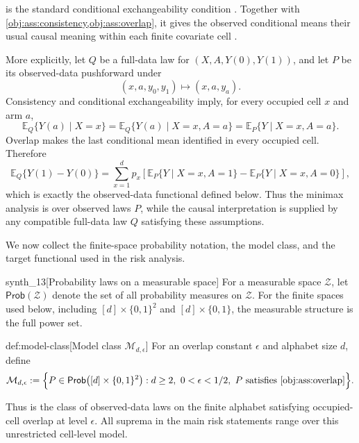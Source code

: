  is the standard conditional exchangeability condition \citep{ZengBalakrishnanHanKennedy2024}. Together with \cref{obj:ass:consistency,obj:ass:overlap}, it gives the observed conditional means their usual causal meaning within each finite covariate cell \citep{RosenbaumRubin1983,ImbensRubin2015}.

More explicitly, let \(Q\) be a full-data law for
\((X,A,Y(0),Y(1))\), and let \(P\) be its observed-data pushforward under
\[
(x,a,y_0,y_1)\longmapsto (x,a,y_a).
\]
Consistency and conditional exchangeability imply, for every occupied cell \(x\) and arm \(a\),
\[
\mathbb E_Q\{Y(a)\mid X=x\}
=
\mathbb E_Q\{Y(a)\mid X=x,A=a\}
=
\mathbb E_P\{Y\mid X=x,A=a\}.
\]
Overlap makes the last conditional mean identified in every occupied cell. Therefore
\[
\mathbb E_Q\{Y(1)-Y(0)\}
=
\sum_{x=1}^d p_x
\left[
\mathbb E_P\{Y\mid X=x,A=1\}
-
\mathbb E_P\{Y\mid X=x,A=0\}
\right],
\]
which is exactly the observed-data functional defined below. Thus the minimax analysis is over observed laws \(P\), while the causal interpretation is supplied by any compatible full-data law \(Q\) satisfying these assumptions.

We now collect the finite-space probability notation, the model class, and the target functional used in the risk analysis.

\begin{definitionv}{synth_13}[Probability laws on a measurable space]
For a measurable space \(\mathcal Z\), let \(\mathsf{Prob}(\mathcal Z)\) denote the set of all probability measures on \(\mathcal Z\). For the finite spaces used below, including \([d]\times\{0,1\}^2\) and \([d]\times\{0,1\}\), the measurable structure is the full power set.
\end{definitionv}

\begin{definitionv}{def:model-class}[Model class \(\mathcal M_{d,\epsilon}\)]
For an overlap constant \(\epsilon\) and alphabet size \(d\), define
\[
\mathcal M_{d,\epsilon}
:=
\Bigl\{
P\in\mathsf{Prob}\bigl([d]\times\{0,1\}^2\bigr):
d\ge2,\ 0<\epsilon<1/2,\ \text{\(P\) satisfies \cref{obj:ass:overlap}}
\Bigr\}.
\]
\end{definitionv}

Thus  is the class of observed-data laws on the finite alphabet satisfying occupied-cell overlap at level \(\epsilon\). All suprema in the main risk statements range over this unrestricted cell-level model.

